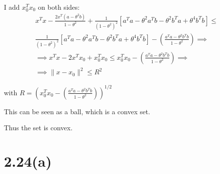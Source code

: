 \documentclass{article}
\begin{document}
I add $x_0^T x_0$ on both sides:
\begin{align*}
    x^T x - \frac{2 x^T (a - \theta^2 b)}{1 - \theta^2} + \frac{1}{(1 - \theta^2)^2} \left[ a^T a - \theta^2 a^T b - \theta^2 b^T a + \theta^4 b^T b \right] \leq \\
    \frac{1}{(1 - \theta^2)^2} \left[ a^T a - \theta^2 a^T b - \theta^2 b^T a + \theta^4 b^T b \right] - \left( \frac{a^T a - \theta^2 b^T b}{1 - \theta^2} \right) \implies \\
    \implies x^T x - 2 x^T x_0 + x_0^T x_0 \leq x_0^T x_0 - \left( \frac{a^T a - \theta^2 b^T b}{1 - \theta^2} \right) \implies \\
    \implies \|x - x_0\|^2 \leq R^2
\end{align*}

with $R = \left( x_0^T x_0 - \left( \frac{a^T a - \theta^2 b^T b}{1 - \theta^2} \right) \right)^{1/2}$



This can be seen as a ball, which is a convex set. 

Thus the set is convex.






























\newpage
\section*{2.24(a)}
\end{document}
